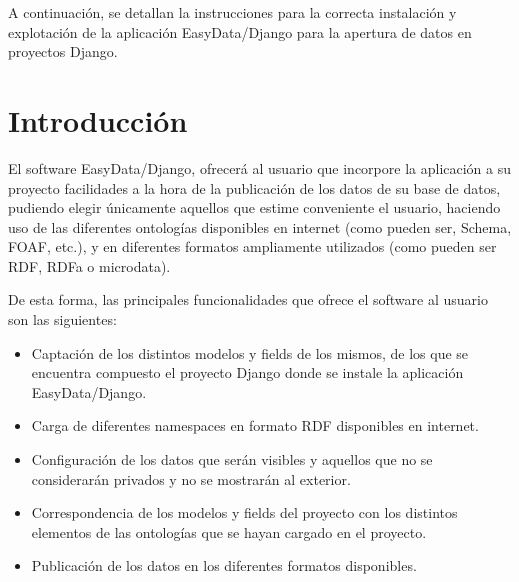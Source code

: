 

A continuación, se detallan la instrucciones para la correcta instalación y
explotación de la aplicación EasyData/Django para la apertura de datos en
proyectos Django.


\section{Introducción}

El software EasyData/Django, ofrecerá al usuario que incorpore la aplicación a
su proyecto facilidades a la hora de la publicación de los datos de su base de
datos, pudiendo elegir únicamente aquellos que estime conveniente el usuario,
haciendo uso de las diferentes ontologías disponibles en internet (como pueden
ser, Schema, FOAF, etc.), y en diferentes formatos ampliamente utilizados (como
pueden ser RDF, RDFa o microdata).

De esta forma, las principales funcionalidades que ofrece el software al usuario
son las siguientes:
\begin{itemize}
    \item Captación de los distintos modelos y fields de los mismos, de los que
        se encuentra compuesto el proyecto Django donde se instale la aplicación
        EasyData/Django.
    \item Carga de diferentes namespaces en formato RDF disponibles en internet.
    \item Configuración de los datos que serán visibles y aquellos que no se
        considerarán privados y no se mostrarán al exterior.
    \item Correspondencia de los modelos y fields del proyecto con los distintos
        elementos de las ontologías que se hayan cargado en el proyecto.
    \item Publicación de los datos en los diferentes formatos disponibles.
\end{itemize}

